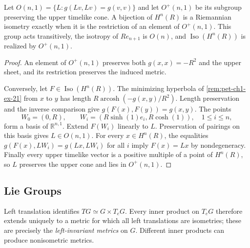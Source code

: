 \begin{example}
  \label{ex:pet-ch1-isometry-group-hyperbolic}


  Let
  $O(n,1)=\{L:g(Lv,Lv)=g(v,v)\}$ and let $O^+(n,1)$ be its subgroup preserving
  the upper timelike cone. A bijection of $H^n(R)$ is a Riemannian isometry
  exactly when it is the restriction of an element of $O^+(n,1)$. This group
  acts transitively, the isotropy of $Re_{n+1}$ is $O(n)$, and
  $\operatorname{Iso}(H^n(R))$ is realized by $O^+(n,1)$.
\end{example}
\begin{proof}

  \sketch
  An element of $O^+(n,1)$ preserves both $g(x,x)=-R^2$ and the upper sheet,
  and its restriction preserves the induced metric.

  Conversely, let $F\in\operatorname{Iso}(H^n(R))$. The minimizing hyperbola
  of \cref{rem:pet-ch1-ex-21} from $x$ to $y$ has length
  $R\operatorname{arcosh}(-g(x,y)/R^2)$. Length preservation and the inverse
  comparison give $g(F(x),F(y))=g(x,y)$.
  The points
  \[
    W_0=(0,R),\qquad
    W_i=(R\sinh(1)e_i,R\cosh(1)),\quad 1\le i\le n,
  \]
  form a basis of $\mathbb{R}^{n,1}$. Extend $F(W_i)$ linearly to $L$.
  Preservation of pairings on this basis gives $L\in O(n,1)$. For every
  $x\in H^n(R)$, the equalities
  $g(F(x),LW_i)=g(Lx,LW_i)$ for all $i$ imply $F(x)=Lx$ by nondegeneracy.
  Finally every upper timelike vector is a positive multiple of a point of
  $H^n(R)$, so $L$ preserves the upper cone and lies in $O^+(n,1)$.
\end{proof}

\subsection{Lie Groups}

\begin{definition}
  \label{def:pet-ch1-left-invariant-metric}


  Left translation identifies $TG\simeq G\times T_eG$. Every inner product on
  $T_eG$ therefore extends uniquely to a metric for which all left translations
  are isometries; these are precisely the \emph{left-invariant metrics} on $G$.
  Different inner products can produce nonisometric metrics.
\end{definition}

